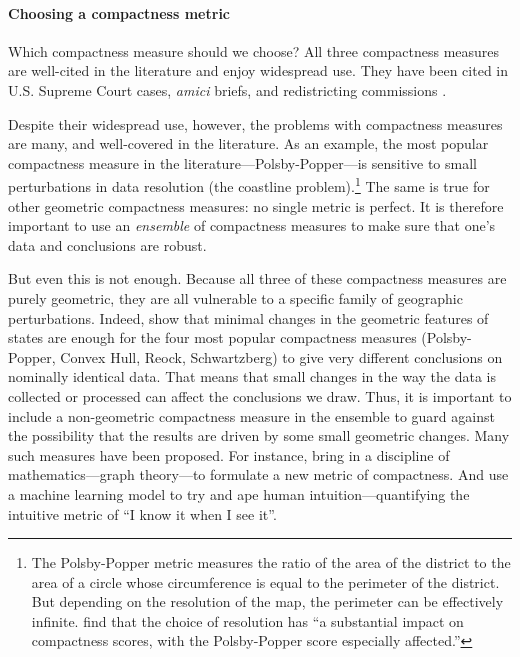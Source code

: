 \documentclass[]{article}
\let\oldparagraph\paragraph
\renewcommand{\paragraph}[1]{\oldparagraph{#1}\mbox{}}
\begin{document}
\hypertarget{choosing-a-compactness-metric}{%
\paragraph{Choosing a compactness
metric}\label{choosing-a-compactness-metric}}

Which compactness measure should we choose? All three compactness
measures are well-cited in the literature and enjoy widespread use. They
have been cited in U.S. Supreme Court cases, \emph{amici} briefs, and
redistricting commissions \citep{moncrief2011}.

Despite their widespread use, however, the problems with compactness
measures are many, and well-covered in the literature. As an example,
the most popular compactness measure in the
literature---Polsby-Popper---is sensitive to small perturbations in data
resolution (the coastline problem).\footnote{The Polsby-Popper metric
  measures the ratio of the area of the district to the area of a circle
  whose circumference is equal to the perimeter of the district. But
  depending on the resolution of the map, the perimeter can be
  effectively infinite. \citeauthor{bswp} find that the choice of
  resolution has ``a substantial impact on compactness scores, with the
  Polsby-Popper score especially affected.''} The same is true for other
geometric compactness measures: no single metric is perfect. It is
therefore important to use an \emph{ensemble} of compactness measures to
make sure that one's data and conclusions are robust.

But even this is not enough. Because all three of these compactness
measures are purely geometric, they are all vulnerable to a specific
family of geographic perturbations. Indeed, \cite{bswp} show that
minimal changes in the geometric features of states are enough for the
four most popular compactness measures (Polsby-Popper, Convex Hull,
Reock, Schwartzberg) to give very different conclusions on nominally
identical data. That means that small changes in the way the data is
collected or processed can affect the conclusions we draw. Thus, it is
important to include a non-geometric compactness measure in the ensemble
to guard against the possibility that the results are driven by some
small geometric changes. Many such measures have been proposed. For
instance, \cite{dc2016} bring in a discipline of mathematics---graph
theory---to formulate a new metric of compactness. And \cite{kingwp} use
a machine learning model to try and ape human intuition---quantifying
the intuitive metric of ``I know it when I see it''.
\end{document}
